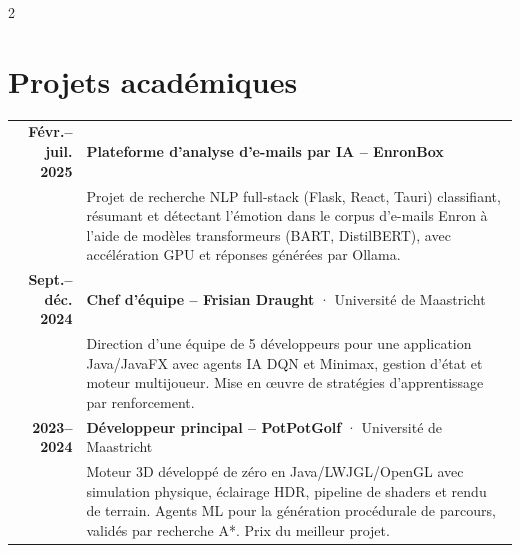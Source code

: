 \documentclass[lighthipster]{simplehipstercv}
\begin{document}
\begin{paracol}{2}
\vspace{0.9em}

\section*{Projets académiques}

\begin{tabular}{r| p{}}
    \textbf{Févr.--juil. 2025} & \textbf{Plateforme d'analyse d'e-mails par IA -- EnronBox} \\
    & {\footnotesize Projet de recherche NLP full-stack (Flask, React, Tauri) classifiant, résumant et détectant l'émotion dans le corpus d'e-mails Enron à l'aide de modèles transformeurs (BART, DistilBERT), avec accélération GPU et réponses générées par Ollama.} \\[0.7em]

    \textbf{Sept.--déc. 2024} & \textbf{Chef d'équipe -- Frisian Draught} · Université de Maastricht \\
    & {\footnotesize Direction d'une équipe de 5 développeurs pour une application Java/JavaFX avec agents IA DQN et Minimax, gestion d'état et moteur multijoueur. Mise en œuvre de stratégies d'apprentissage par renforcement.} \\[0.7em]

    \textbf{2023--2024} & \textbf{Développeur principal -- PotPotGolf} · Université de Maastricht \\
    & {\footnotesize Moteur 3D développé de zéro en Java/LWJGL/OpenGL avec simulation physique, éclairage HDR, pipeline de shaders et rendu de terrain. Agents ML pour la génération procédurale de parcours, validés par recherche A*. Prix du meilleur projet.} \\
\end{tabular}

\vspace{0.9em}

\begin{minipage}[t]{0.45\textwidth}

\end{minipage}
\end{paracol}
\end{document}
